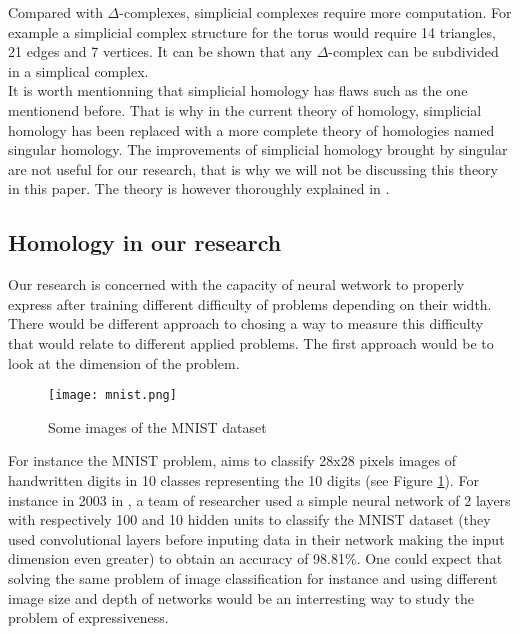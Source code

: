 \documentclass[12pt, a4paper]{article}
\begin{document}
Compared with $\Delta$-complexes, simplicial complexes require more computation. For example a simplicial complex structure for the torus would require 14 triangles, 21 edges and 7 vertices. It can be shown that any $\Delta$-complex can be subdivided in a simplical complex.\\


It is worth mentionning that simplicial homology has flaws such as the one mentionend before. That is why in the current theory of homology, simplicial homology has been replaced with a more complete theory of homologies named singular homology. The improvements of simplicial homology brought by singular are not useful for our research, that is why we will not be discussing this theory in this paper. The theory is however thoroughly explained in \cite{hatcher_algebraic_2002}.

\subsection{Homology in our research}
\label{sec:homology_research}

Our research is concerned with the capacity of neural wetwork to properly express after training different difficulty of problems depending on their width. There would be different approach to chosing a way to measure this difficulty that would relate to different applied problems. The first approach would be to look at the dimension of the problem.\\

\begin{figure}[h]
  \centering
  \texttt{[image: mnist.png]}
  \caption{Some images of the MNIST dataset}
  \label{fig:mnist}
\end{figure}

For instance the MNIST problem, aims to classify 28x28 pixels images of handwritten digits in 10 classes representing the 10 digits (see Figure \ref{fig:mnist}). For instance in 2003 in \cite{simard_best_2003}, a team of researcher used a simple neural network of 2 layers with respectively 100 and 10 hidden units to classify the MNIST dataset (they used convolutional layers before inputing data in their network making the input dimension even greater) to obtain an accuracy of 98.81\%. One could expect that solving the same problem of image classification for instance and using different image size and depth of networks would be an interresting way to study the problem of expressiveness.\\
\end{document}
